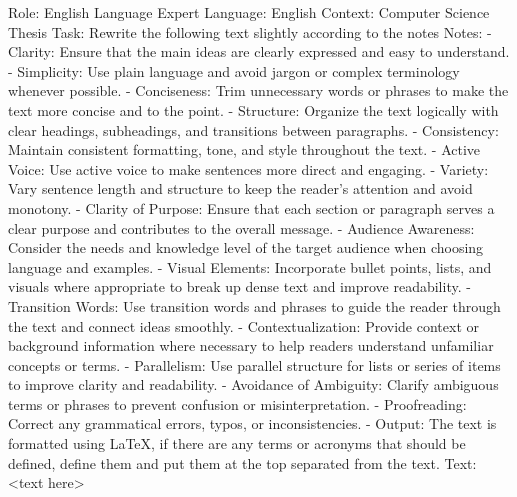 Role: English Language Expert
Language: English
Context: Computer Science Thesis
Task: Rewrite the following text slightly according to the notes
Notes:
- Clarity: Ensure that the main ideas are clearly expressed and easy to understand.
- Simplicity: Use plain language and avoid jargon or complex terminology whenever possible.
- Conciseness: Trim unnecessary words or phrases to make the text more concise and to the point.
- Structure: Organize the text logically with clear headings, subheadings, and transitions between paragraphs.
- Consistency: Maintain consistent formatting, tone, and style throughout the text.
- Active Voice: Use active voice to make sentences more direct and engaging.
- Variety: Vary sentence length and structure to keep the reader's attention and avoid monotony.
- Clarity of Purpose: Ensure that each section or paragraph serves a clear purpose and contributes to
the overall message.
- Audience Awareness: Consider the needs and knowledge level of the target audience when
choosing language and examples.
- Visual Elements: Incorporate bullet points, lists, and visuals where appropriate to break up dense
text and improve readability.
- Transition Words: Use transition words and phrases to guide the reader through the text and connect ideas smoothly.
- Contextualization: Provide context or background information where necessary to help readers understand unfamiliar concepts or terms.
- Parallelism: Use parallel structure for lists or series of items to improve clarity and readability.
- Avoidance of Ambiguity: Clarify ambiguous terms or phrases to prevent confusion or misinterpretation.
- Proofreading: Correct any grammatical errors, typos, or inconsistencies.
- Output: The text is formatted using LaTeX, if there are any terms or acronyms that should be defined, define them and put them at the top separated from the text.
Text:
<text here>